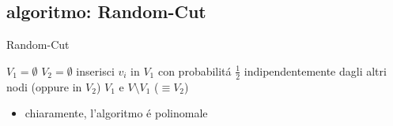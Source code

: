 
\newpage
\subsection*{algoritmo: Random-Cut}
\begin{flushleft}
	\begin{algorithm}
		\caption{Random-Cut}
		\begin{algorithmic}
			\STATE $V_1=\emptyset$
			\STATE $V_2=\emptyset$
				\STATE inserisci $v_i$ in $V_1$ con probabilit\'a $\frac{1}{2}$ indipendentemente dagli altri nodi (oppure in $V_2$)
			\ENDFOR
			\RETURN $V_1$ e $V\setminus V_1$ ($\equiv V_2$)
		\end{algorithmic}
	\end{algorithm}
	\begin{itemize}
		\item chiaramente, l'algoritmo \'e polinomale
	\end{itemize}
\end{flushleft}


\subsection*{}
\begin{flushleft}
\end{flushleft}


\subsection*{}
\begin{flushleft}
\end{flushleft}


\subsection*{}
\begin{flushleft}
\end{flushleft}

